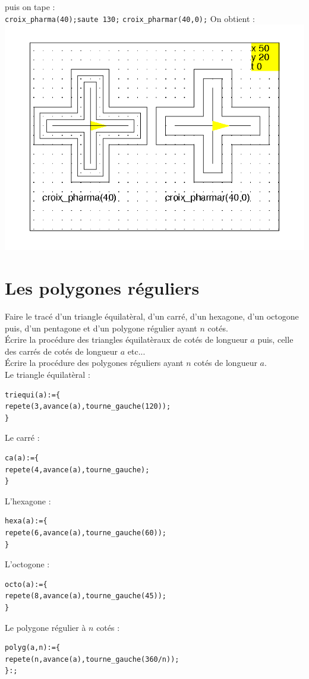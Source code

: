 \documentclass[a4paper,11pt]{book}
\begin{document}
puis on tape :\\
{\tt croix\_pharma(40);saute 130;}
{\tt croix\_pharmar(40,0);}
On obtient :\\
\includegraphics[width=\textwidth]{tortpharma}
\section{Les polygones r\'eguliers}
Faire le trac\'e d'un triangle \'equilat\`eral, d'un carr\'e, d'un hexagone,
 d'un octogone puis, d'un pentagone et d'un polygone r\'egulier ayant 
$n$ cot\'es.\\
\'Ecrire la proc\'edure des triangles \'equilat\`eraux de cot\'es de longueur 
$a$ puis, celle  des carr\'es de cot\'es de longueur $a$ etc...\\
\'Ecrire la proc\'edure des polygones r\'eguliers ayant $n$ cot\'es de longueur
 $a$.\\
Le triangle \'equilat\`eral :
\begin{verbatim}
triequi(a):={
repete(3,avance(a),tourne_gauche(120));
}
\end{verbatim}
Le carr\'e :
\begin{verbatim}
ca(a):={
repete(4,avance(a),tourne_gauche);
}
\end{verbatim}
L'hexagone :
\begin{verbatim}
hexa(a):={
repete(6,avance(a),tourne_gauche(60));
}
\end{verbatim}
L'octogone :
\begin{verbatim}
octo(a):={
repete(8,avance(a),tourne_gauche(45));
}
\end{verbatim}
Le polygone r\'egulier \`a $n$ cot\'es :
\begin{verbatim}
polyg(a,n):={
repete(n,avance(a),tourne_gauche(360/n));
}:;
\end{verbatim}
\end{document}
